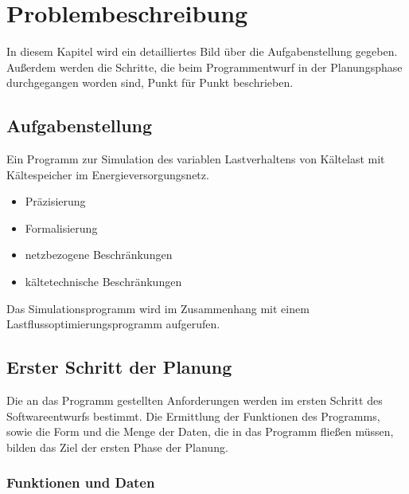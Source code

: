 \chapter{Problembeschreibung}
\label{chap:problemstellung}
\minitoc

In diesem Kapitel wird ein detailliertes Bild über die Aufgabenstellung gegeben. Außerdem werden die Schritte, die beim
Programmentwurf in der Planungsphase durchgegangen worden sind, Punkt für Punkt beschrieben.

\section{Aufgabenstellung}

Ein Programm zur Simulation des variablen Lastverhaltens von Kältelast mit Kältespeicher im
Energieversorgungsnetz.

\begin{itemize}
\item Präzisierung
\item Formalisierung
\end{itemize}

\begin{itemize}
\item netzbezogene Beschränkungen
\item kältetechnische Beschränkungen
\end{itemize}

Das Simulationsprogramm wird im Zusammenhang mit einem Lastflussoptimierungsprogramm aufgerufen.

\section{Erster Schritt der Planung}

Die an das Programm gestellten Anforderungen werden im ersten Schritt des Softwareentwurfs bestimmt. Die Ermittlung
der Funktionen des Programms, sowie die Form und die Menge der Daten, die in das Programm fließen müssen, bilden das Ziel der
ersten Phase der Planung.

\subsection{Funktionen und Daten}

